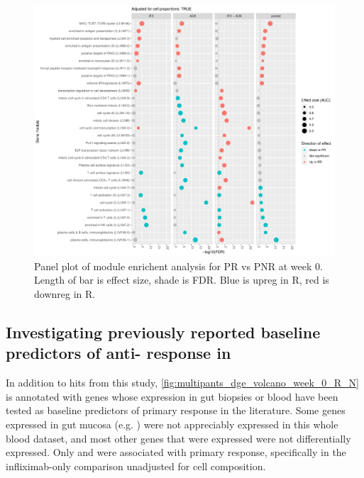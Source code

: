 \begin{outline}
\begin{figure}
    \centering
    \includegraphics[width=1.0\textwidth,page=1]{mainmatter/figures/chapter_04/plot_gene_set_enrichment.tmodCERNO_panelplot_reversed_C_1RI_1NI,C_1RA_1NA,C_(1RI_1NI)_(1RA_1NA),C_1R_1N.cell_prop_correction_TRUE.pdf}
    \caption{Panel plot of module enrichent analysis for PR vs PNR at week 0. Length of bar is effect size, shade is FDR. Blue is upreg in R, red is downreg in R.}
    \label{fig:multipants_dge_panelPlot_week_0_R_N_cellPropT}
\end{figure}

\subsection{Investigating previously reported baseline predictors of anti- response in }

In addition to hits from this study, \autoref{fig:multipants_dge_volcano_week_0_R_N} is annotated with genes whose expression in gut biopsies or blood have been tested as baseline predictors of primary response in the literature\autocite{arijs2009MucosalGeneSignatures,arijs2010PredictiveValueEpithelial,verstockt2019LowTREM1Expression,salvador-martin2020GeneSignaturesEarly}.
Some genes expressed in gut mucosa (e.g. ) were not appreciably expressed in this whole blood dataset, 
and most other genes that were expressed were not differentially expressed.
Only  and  were associated with primary response, specifically in the infliximab-only comparison unadjusted for cell composition.


\end{outline}
